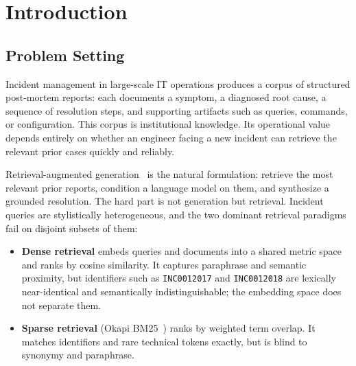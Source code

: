 \documentclass[12pt, a4paper]{article}
\begin{document}
\newpage
\setcounter{tocdepth}{1}
\tableofcontents
\newpage

\section{Introduction}
\label{sec:intro}

\subsection{Problem Setting}

Incident management in large-scale IT operations produces a corpus of structured post-mortem reports: each documents a symptom, a diagnosed root cause, a sequence of resolution steps, and supporting artifacts such as queries, commands, or configuration. This corpus is institutional knowledge. Its operational value depends entirely on whether an engineer facing a new incident can retrieve the relevant prior cases quickly and reliably.

Retrieval-augmented generation~\cite{lewis2020rag} is the natural formulation: retrieve the most relevant prior reports, condition a language model on them, and synthesize a grounded resolution. The hard part is not generation but retrieval. Incident queries are stylistically heterogeneous, and the two dominant retrieval paradigms fail on disjoint subsets of them:

\begin{itemize}
    \item \textbf{Dense retrieval} embeds queries and documents into a shared metric space and ranks by cosine similarity. It captures paraphrase and semantic proximity, but identifiers such as \texttt{INC0012017} and \texttt{INC0012018} are lexically near-identical and semantically indistinguishable; the embedding space does not separate them.
    \item \textbf{Sparse retrieval} (Okapi BM25~\cite{robertson2009bm25}) ranks by weighted term overlap. It matches identifiers and rare technical tokens exactly, but is blind to synonymy and paraphrase.
\end{itemize}
\end{document}
